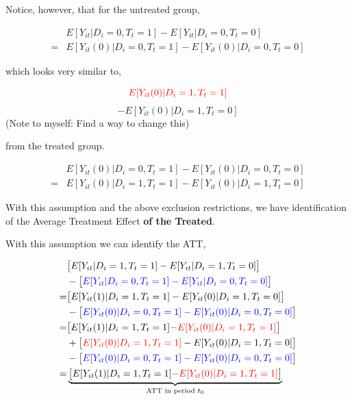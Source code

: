 \documentclass[
  letterpaper,
  DIV=11,
  numbers=noendperiod]{scrreprt}
\theoremstyle{definition}
\theoremstyle{remark}
\begin{document}
Notice, however, that for the untreated group,

\[
\begin{aligned}
&E[Y_{it}|D_i=0,T_t=1]-E[Y_{it}|D_i=0,T_t=0] \\
=&E[Y_{it}(0)|D_i=0,T_t=1]-E[Y_{it}(0)|D_i=0,T_t=0]
\end{aligned}
\]

which looks very similar to,

\[
\color{red}{E[Y_{it}(0)|D_i=1,T_t=1]}
\] \[
-E[Y_{it}(0)|D_i=1,T_t=0]
\] (Note to myself: Find a way to change this)

from the treated group.

\begin{tcolorbox}[enhanced jigsaw, breakable, colframe=quarto-callout-note-color-frame, toptitle=1mm, toprule=.15mm, opacitybacktitle=0.6, opacityback=0, rightrule=.15mm, titlerule=0mm, colback=white, bottomtitle=1mm, title={Parallel Trends Assumption (General version)}, arc=.35mm, coltitle=black, colbacktitle=quarto-callout-note-color!10!white, leftrule=.75mm, bottomrule=.15mm, left=2mm]

\[
\begin{aligned}
&E[Y_{it}(0)|D_i=0,T_t=1]-E[Y_{it}(0)|D_i=0,T_t=0] \\
=&E[Y_{it}(0)|D_i=1,T_t=1]-E[Y_{it}(0)|D_i=1,T_t=0]
\end{aligned}
\]

\end{tcolorbox}

With this assumption and the above exclusion restrictions, we have
identification of the Average Treatment Effect \textbf{of the Treated}.

With this assumption we can identify the ATT,

\[
\begin{aligned}
&\big[E[Y_{it}|D_i=1,T_t=1]-E[Y_{it}|D_i=1,T_t=0]\big]\\
&-\big[\textcolor{blue}{E[Y_{it}|D_i=0,T_t=1]-E[Y_{it}|D_i=0,T_t=0]}\big] \\
=&\big[E[Y_{it}(1)|D_i=1,T_t=1]-E[Y_{it}(0)|D_i=1,T_t=0]\big] \\
&-\big[\textcolor{blue}{E[Y_{it}(0)|D_i=0,T_t=1]-E[Y_{it}(0)|D_i=0,T_t=0]}\big] \\
=&\big[E[Y_{it}(1)|D_i=1,T_t=1]\textcolor{red}{-E[Y_{it}(0)|D_i=1,T_t=1]}\big] \\
&+\big[\textcolor{red}{E[Y_{it}(0)|D_i=1,T_t=1]}-E[Y_{it}(0)|D_i=1,T_t=0]\big] \\
&-\big[\textcolor{blue}{E[Y_{it}(0)|D_i=0,T_t=1]-E[Y_{it}(0)|D_i=0,T_t=0]}\big] \\
=&\underbrace{\big[E[Y_{it}(1)|D_i=1,T_t=1]\textcolor{red}{-E[Y_{it}(0)|D_i=1,T_t=1]}\big]}_{\text{ATT in period } t_0}
\end{aligned}
\]
\end{document}
